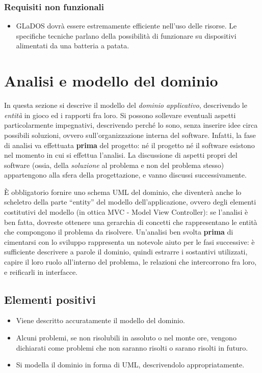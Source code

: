\documentclass[a4paper,12pt]{report}
\begin{document}
\subsubsection{Requisiti non funzionali}
\begin{itemize}
	\item GLaDOS dovrà essere estremamente efficiente nell'uso delle risorse. Le specifiche tecniche parlano della possibilità di funzionare su dispositivi alimentati da una batteria a patata.
\end{itemize}

\section{Analisi e modello del dominio}

In questa sezione si descrive il modello del \textit{dominio
applicativo}, descrivendo le \textit{entità} in gioco ed i rapporti fra loro.
%
Si possono sollevare eventuali aspetti particolarmente impegnativi, descrivendo perché lo sono, senza inserire idee circa possibili soluzioni, ovvero sull'organizzazione interna del software.
%
Infatti, la fase di analisi va effettuata \textbf{prima} del progetto: né il progetto né il software esistono nel momento in cui si effettua l'analisi.
%
La discussione di aspetti propri del software (ossia, della \textit{soluzione} al problema e non del problema stesso) appartengono alla sfera della progettazione, e vanno discussi successivamente.

È obbligatorio fornire uno schema UML del dominio, che diventerà anche lo scheletro della
parte ``entity'' del modello dell'applicazione, ovvero degli elementi costitutivi del modello (in ottica MVC - Model View Controller): se l'analisi è ben fatta, dovreste ottenere una gerarchia di concetti che rappresentano le entità che compongono il problema da risolvere.
%
Un'analisi ben svolta \textbf{prima} di cimentarsi con lo sviluppo rappresenta un notevole aiuto per
le fasi successive: è sufficiente descrivere a parole il dominio, quindi estrarre i sostantivi
utilizzati, capire il loro ruolo all'interno del problema, le relazioni che intercorrono fra loro, e
reificarli in interfacce.

\subsection*{Elementi positivi}
\begin{itemize}
	\item Viene descritto accuratamente il modello del dominio.
	\item Alcuni problemi, se non risolubili in assoluto o nel monte ore, vengono dichiarati come problemi che non saranno risolti o sarano risolti in futuro.
	\item Si modella il dominio in forma di UML, descrivendolo appropriatamente.
\end{itemize}
\end{document}
